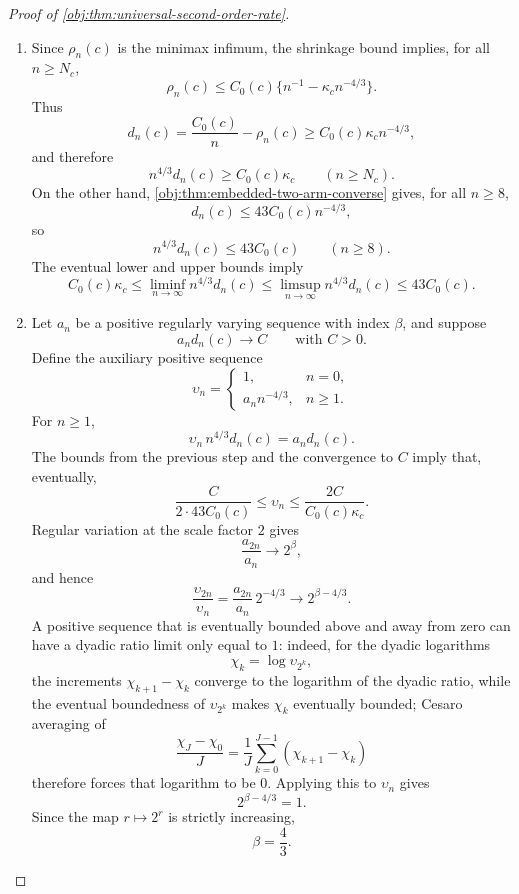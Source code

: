 \documentclass[11pt]{article}
\begin{document}
\begin{proof}[Proof of \cref{obj:thm:universal-second-order-rate}]
\begin{enumerate}
If \(|\Theta_n(z)|>b_n/2\), then the lower bound on \(Q_n(z)\) yields
\[
\frac{Q_n(z)}{n^2}\ge \frac{\lambda_c}{2}n^{-4/3}.
\]
Using \(\mathcal C_n(z)\ge 0\) and the same identity for \(\varepsilon_n^2b_n^2\),
\[
\mathbb E\!\left[\{X_n-\varepsilon_n g_n(X_n)-\Theta_n(z)\}^2\mid z\right]
\le
\frac1n-\frac{7\lambda_c}{16}n^{-4/3}
\le
\frac1n-\kappa_c n^{-4/3}.
\]
The two cases cover every schedule. Multiplying by \((L_c/2)^2=C_0(c)\) gives, uniformly in \(z\),
\[
R_n(\mathcal D^\star,\widehat\tau_n^{\mathrm{sh}};z)
\le
C_0(c)\{n^{-1}-\kappa_c n^{-4/3}\}.
\]
Taking the supremum over schedules proves the asserted clipped-shrinkage risk bound for all \(n\ge N_c\).

\item Since \(\rho_n(c)\) is the minimax infimum, the shrinkage bound implies, for all \(n\ge N_c\),
\[
\rho_n(c)
\le
C_0(c)\{n^{-1}-\kappa_c n^{-4/3}\}.
\]
Thus
\[
d_n(c)=\frac{C_0(c)}n-\rho_n(c)
\ge
C_0(c)\kappa_c n^{-4/3},
\]
and therefore
\[
n^{4/3}d_n(c)\ge C_0(c)\kappa_c
\qquad(n\ge N_c).
\]
On the other hand, \cref{obj:thm:embedded-two-arm-converse} gives, for all \(n\ge 8\),
\[
d_n(c)\le 43C_0(c)n^{-4/3},
\]
so
\[
n^{4/3}d_n(c)\le 43C_0(c)
\qquad(n\ge 8).
\]
The eventual lower and upper bounds imply
\[
C_0(c)\kappa_c
\le
\liminf_{n\to\infty} n^{4/3}d_n(c)
\le
\limsup_{n\to\infty} n^{4/3}d_n(c)
\le
43C_0(c).
\]

\item Let \(a_n\) be a positive regularly varying sequence with index \(\beta\), and suppose
\[
a_n d_n(c)\longrightarrow C
\qquad\text{with }C>0.
\]
Define the auxiliary positive sequence
\[
\upsilon_n=
\begin{cases}
1,& n=0,\\
a_n n^{-4/3},& n\ge 1.
\end{cases}
\]
For \(n\ge1\),
\[
\upsilon_n\, n^{4/3}d_n(c)=a_nd_n(c).
\]
The bounds from the previous step and the convergence to \(C\) imply that, eventually,
\[
\frac{C}{2\cdot 43C_0(c)}
\le
\upsilon_n
\le
\frac{2C}{C_0(c)\kappa_c}.
\]
Regular variation at the scale factor \(2\) gives
\[
\frac{a_{2n}}{a_n}\longrightarrow 2^\beta,
\]
and hence
\[
\frac{\upsilon_{2n}}{\upsilon_n}
=
\frac{a_{2n}}{a_n}\,2^{-4/3}
\longrightarrow
2^{\beta-4/3}.
\]
A positive sequence that is eventually bounded above and away from zero can have a dyadic ratio limit only equal to \(1\): indeed, for the dyadic logarithms
\[
\chi_k=\log \upsilon_{2^k},
\]
the increments \(\chi_{k+1}-\chi_k\) converge to the logarithm of the dyadic ratio, while the eventual boundedness of \(\upsilon_{2^k}\) makes \(\chi_k\) eventually bounded; Cesaro averaging of
\[
\frac{\chi_J-\chi_0}{J}
=
\frac1J\sum_{k=0}^{J-1}(\chi_{k+1}-\chi_k)
\]
therefore forces that logarithm to be \(0\). Applying this to \(\upsilon_n\) gives
\[
2^{\beta-4/3}=1.
\]
Since the map \(r\mapsto 2^r\) is strictly increasing,
\[
\beta=\frac43 .
\]
\end{enumerate}
\end{proof}
\end{document}
